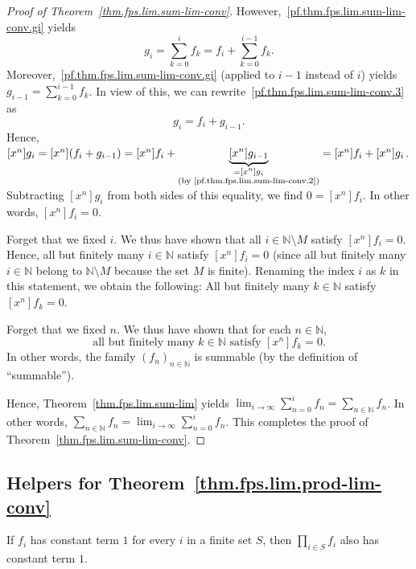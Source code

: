\begin{proof}[Proof of Theorem~\ref{thm.fps.lim.sum-lim-conv}]
However,~\eqref{pf.thm.fps.lim.sum-lim-conv.gi} yields
\begin{equation}
g_i = \sum_{k=0}^{i} f_k = f_i + \sum_{k=0}^{i-1} f_k.
\label{pf.thm.fps.lim.sum-lim-conv.3}
\end{equation}
Moreover,~\eqref{pf.thm.fps.lim.sum-lim-conv.gi} (applied to $i-1$
instead of $i$) yields $g_{i-1} = \sum_{k=0}^{i-1} f_k$. In view of
this, we can rewrite~\eqref{pf.thm.fps.lim.sum-lim-conv.3} as
\[
g_i = f_i + g_{i-1}.
\]
Hence,
$[x^n] g_i = [x^n](f_i + g_{i-1}) = [x^n] f_i + \underbrace{[x^n] g_{i-1}}_{\substack{= [x^n] g_i \\ \text{(by~\eqref{pf.thm.fps.lim.sum-lim-conv.2})}}}
= [x^n] f_i + [x^n] g_i$.
Subtracting $[x^n] g_i$ from both sides of this equality, we find
$0 = [x^n] f_i$. In other words, $[x^n] f_i = 0$.

Forget that we fixed $i$. We thus have shown that all
$i\in\mathbb{N}\setminus M$ satisfy $[x^n] f_i = 0$. Hence, all but
finitely many $i\in\mathbb{N}$ satisfy $[x^n] f_i = 0$ (since all but
finitely many $i\in\mathbb{N}$ belong to $\mathbb{N}\setminus M$
because the set $M$ is finite). Renaming the index $i$ as $k$ in this
statement, we obtain the following: All but finitely many
$k\in\mathbb{N}$ satisfy $[x^n] f_k = 0$.

Forget that we fixed $n$. We thus have shown that for each
$n\in\mathbb{N}$,
\[
\text{all but finitely many } k\in\mathbb{N} \text{ satisfy }
[x^n] f_k = 0.
\]
In other words, the family $(f_n)_{n\in\mathbb{N}}$ is summable (by the
definition of ``summable'').

Hence, Theorem~\ref{thm.fps.lim.sum-lim} yields
$\lim_{i\to\infty} \sum_{n=0}^{i} f_n = \sum_{n\in\mathbb{N}} f_n$.
In other words,
$\sum_{n\in\mathbb{N}} f_n = \lim_{i\to\infty} \sum_{n=0}^{i} f_n$.
This completes the proof of Theorem~\ref{thm.fps.lim.sum-lim-conv}.
\end{proof}

\subsection{Helpers for Theorem~\ref{thm.fps.lim.prod-lim-conv}}

\begin{lemma}
\label{lem.fps.lim.constantCoeff-prod-eq-one}
\leanhelper
\leanok
If $f_i$ has constant term $1$ for every $i$ in a finite set $S$,
then $\prod_{i \in S} f_i$ also has constant term $1$.
\end{lemma}

